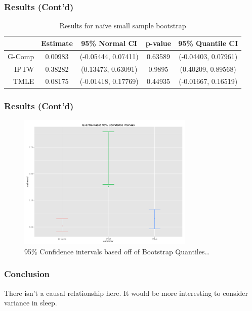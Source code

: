 \documentclass{beamer}
\begin{document}
\begin{frame}
\frametitle{Results (Cont'd)}
\begin{table}[ht]
\centering
{\small
\begin{tabular}{rcccc}
  \hline
 & Estimate & 95\% Normal CI & p-value & 95\% Quantile CI \\ 
  \hline
G-Comp & 0.00983 & (-0.05444, 0.07411) & 0.63589 & (-0.04403, 0.07961) \\ 
  IPTW & 0.38282 & (0.13473, 0.63091) & 0.9895 & (0.40209, 0.89568) \\ 
  TMLE & 0.08175 & (-0.01418, 0.17769) & 0.44935 & (-0.01667, 0.16519) \\ 
   \hline
\end{tabular}
}
\caption{Results for na\"{i}ve small sample bootstrap}
\end{table}
\end{frame}

\begin{frame}
\frametitle{Results (Cont'd)}
\begin{figure}[ht!]
\centering
\includegraphics[width=0.75\textwidth]{bootstrap-quantile-ci.pdf}
\caption{95\% Confidence intervals based off of Bootstrap Quantiles\ldots}
\end{figure}
\end{frame}

\begin{frame}
\frametitle{Conclusion}
There isn't a causal relationship here.
It would be more interesting to consider variance in sleep.
\end{frame}
\end{document}
